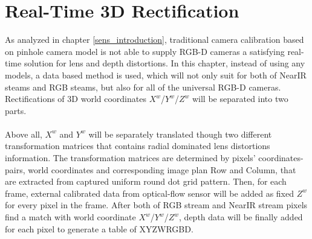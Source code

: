 %
\chapter{Real-Time 3D Rectification} %
\label{sens_Rectification} %
As analyzed in chapter \ref{sens_introduction}, traditional camera calibration based on pinhole camera model is not able to supply RGB-D cameras a satisfying real-time solution for lens and depth distortions. In this chapter, instead of using any models, a data based method is used, which will not only suit for both of NearIR steams and RGB steams, but also for all of the universal RGB-D cameras. Rectifications of 3D world coordinates \(X^{w}\)/\(Y^{w}\)/\(Z^{w}\) will be separated into two parts. 
\\\\%
Above all, \(X^{w}\) and \(Y^{w}\) will be separately translated though two different transformation matrices that contains radial dominated lens distortions information. The transformation matrices are determined by pixels' coordinates-pairs, world coordinates and corresponding image plan Row and Column, that are extracted from captured uniform round dot grid pattern. Then, for each frame, external calibrated data from optical-flow sensor will be added as fixed \(Z^{w}\) for every pixel in the frame. After both of RGB stream and NearIR stream pixels find a match with world coordinate \(X^{w}\)/\(Y^{w}\)/\(Z^{w}\), depth data will be finally added for each pixel to generate a table of XYZWRGBD.

